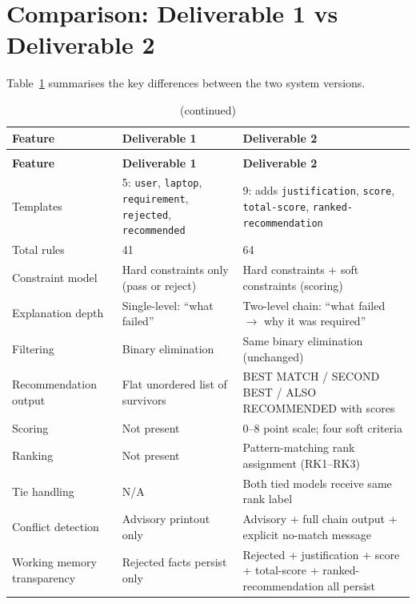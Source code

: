\documentclass[12pt,a4paper]{article}
\begin{document}
\section{Comparison: Deliverable 1 vs Deliverable 2}

Table~\ref{tab:comparison} summarises the key differences between the two system versions.

\renewcommand{\arraystretch}{1.7}
\begin{longtable}{>{\small}p{3.8cm}>{\small}p{5cm}>{\small}p{5cm}}
\caption{Feature comparison between Deliverable 1 and Deliverable 2} \label{tab:comparison} \\
\toprule
\textbf{Feature} & \textbf{Deliverable 1} & \textbf{Deliverable 2} \\
\midrule
\endfirsthead
\caption[]{(continued)} \\
\toprule
\textbf{Feature} & \textbf{Deliverable 1} & \textbf{Deliverable 2} \\
\midrule
\endhead
\bottomrule
\endfoot
Templates
& 5: \texttt{user}, \texttt{laptop}, \texttt{requirement}, \texttt{rejected}, \texttt{recommended}
& 9: adds \texttt{justification}, \texttt{score}, \texttt{total-score}, \texttt{ranked-recommendation} \\[4pt]

Total rules
& 41
& 64 \\[4pt]

Constraint model
& Hard constraints only (pass or reject)
& Hard constraints + soft constraints (scoring) \\[4pt]

Explanation depth
& Single-level: ``what failed''
& Two-level chain: ``what failed $\rightarrow$ why it was required'' \\[4pt]

Filtering
& Binary elimination
& Same binary elimination (unchanged) \\[4pt]

Recommendation output
& Flat unordered list of survivors
& BEST MATCH / SECOND BEST / ALSO RECOMMENDED with scores \\[4pt]

Scoring
& Not present
& 0--8 point scale; four soft criteria \\[4pt]

Ranking
& Not present
& Pattern-matching rank assignment (RK1--RK3) \\[4pt]

Tie handling
& N/A
& Both tied models receive same rank label \\[4pt]

Conflict detection
& Advisory printout only
& Advisory + full chain output + explicit no-match message \\[4pt]

Working memory transparency
& Rejected facts persist only
& Rejected + justification + score + total-score + ranked-recommendation all persist \\

\end{longtable}
\renewcommand{\arraystretch}{1}
\end{document}
